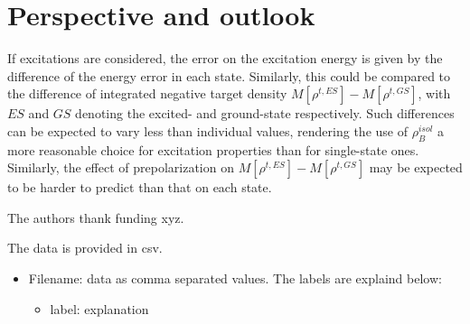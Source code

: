 \documentclass[journal=jctcce,manuscript=article, layout=twocolumn]{achemso}
\begin{document}
\section{Perspective and outlook}
If excitations are considered, the error on the excitation energy is given by the difference of the energy error in each state. 
Similarly, this could be compared to the difference of integrated negative target density $M[\rho^{t, ES}] - M[\rho^{t, GS}]$, with $ES$ and $GS$ denoting the excited- and ground-state respectively.
Such differences can be expected to vary less than individual values, rendering the use of $\rho_B^{isol}$ a more reasonable choice for excitation properties than for single-state ones.
Similarly, the effect of prepolarization on $M[\rho^{t, ES}] - M[\rho^{t, GS}]$ may be expected to be harder to predict than that on each state. 

\begin{acknowledgement}
The authors thank funding xyz.
\end{acknowledgement}

\begin{suppinfo}
The data is provided in csv.
\begin{itemize}
  \item Filename: data as comma separated values. The labels are explaind below:
  \begin{itemize}
   \item label: explanation
  \end{itemize}
\end{itemize}
\end{suppinfo}
\end{document}
